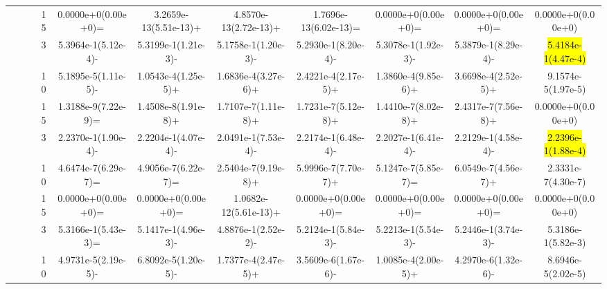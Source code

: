 \documentclass[a4paper,fleqn]{cas-dc}
\newcommand{\highlight}[1]{
	\begingroup
	\sethlcolor{Seashell}%
	\hl{#1}%
	\endgroup
}
\begin{document}
\begin{sloppypar}
\begin{table}[ht]
{\begin{tabular}{cccccccccc}
					\multirow{12}{*}{~}&\multirow{3}{*}{~}&15 &0.0000e+0(0.00e+0)=	&3.2659e-13(5.51e-13)+	&4.8570e-13(2.72e-13)+	&1.7696e-13(6.02e-13)=	&0.0000e+0(0.00e+0)=	&0.0000e+0(0.00e+0)=	&0.0000e+0(0.00e+0)\\
					
					
					
					
					\multirow{12}{*}{~}&\multirow{3}{*}{IDTLZ2} &3 &5.3964e-1(5.12e-4)-	&5.3199e-1(1.21e-3)-	&5.1758e-1(1.20e-3)-	&5.2930e-1(8.20e-4)-	&5.3078e-1(1.92e-3)-	&5.3879e-1(8.29e-4)-	&\highlight{5.4184e-1(4.47e-4)}\\ 
					
					\multirow{12}{*}{~}&\multirow{3}{*}{~}&10  &5.1895e-5(1.11e-5)- 	&1.0543e-4(1.25e-5)+	&1.6836e-4(3.27e-6)+	&2.4221e-4(2.17e-5)+	&1.3860e-4(9.85e-6)+	&3.6698e-4(2.52e-5)+	&9.1574e-5(1.97e-5)\\
					
					\multirow{12}{*}{~}&\multirow{3}{*}{~}&15 &1.3188e-9(7.22e-9)= &1.4508e-8(1.91e-8)+	&1.7107e-7(1.11e-8)+	&1.7231e-7(5.12e-8)+	&1.4410e-7(8.02e-8)+	&2.4317e-7(7.56e-8)+	&0.0000e+0(0.00e+0)\\
					
					
					
					\multirow{12}{*}{~}&\multirow{3}{*}{MaF1} &3 &2.2370e-1(1.90e-4)- &2.2204e-1(4.07e-4)-	&2.0491e-1(7.53e-4)-	&2.2174e-1(6.48e-4)-	&2.2027e-1(6.41e-4)-	&2.2129e-1(4.58e-4)-	&\highlight{2.2396e-1(1.88e-4)}\\ 
					
					\multirow{12}{*}{~}&\multirow{3}{*}{~} &10 &4.6474e-7(6.29e-7)= &4.9056e-7(6.22e-7)=	&2.5404e-7(9.19e-8)+	&5.9996e-7(7.70e-7)+	&5.1247e-7(5.85e-7)=	&6.0549e-7(4.56e-7)+	&2.3331e-7(4.30e-7)\\
					
					\multirow{12}{*}{~}&\multirow{3}{*}{~} &15 &0.0000e+0(0.00e+0)=	&0.0000e+0(0.00e+0)=	&1.0682e-12(5.61e-13)+	&0.0000e+0(0.00e+0)=	&0.0000e+0(0.00e+0)=	&0.0000e+0(0.00e+0)=	&0.0000e+0(0.00e+0)\\
					
					
					
					
					
					
					\multirow{12}{*}{~}&\multirow{3}{*}{MaF4} &3	&5.3166e-1(5.43e-3)=	&5.1417e-1(4.96e-3)-	&4.8876e-1(2.52e-2)-	&5.2124e-1(5.84e-3)-	&5.2213e-1(5.54e-3)-	&5.2446e-1(3.74e-3)-	&5.3186e-1(5.82e-3)\\ 
					
					\multirow{12}{*}{~}&\multirow{3}{*}{~} &10 &4.9731e-5(2.19e-5)-	&6.8092e-5(1.20e-5)-	&1.7377e-4(2.47e-5)+	&3.5609e-6(1.67e-6)-	&1.0085e-4(2.00e-5)+	&4.2970e-6(1.32e-6)-	&8.6946e-5(2.02e-5)\\
					

\end{tabular}}
\end{table}
\end{sloppypar}
\end{document}
